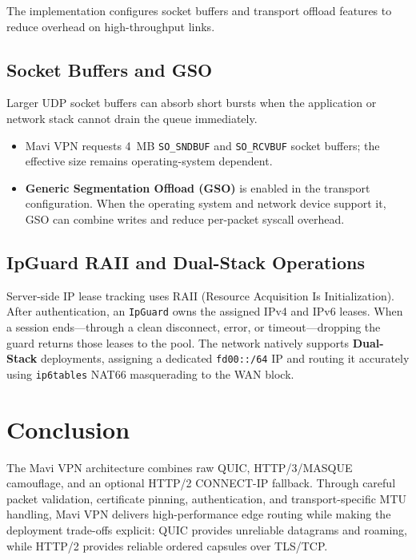 \documentclass[11pt,a4paper]{article}
\begin{document}
The implementation configures socket buffers and transport offload features to reduce overhead on high-throughput links.

\subsection{Socket Buffers and GSO}
Larger UDP socket buffers can absorb short bursts when the application or network stack cannot drain the queue immediately.
\begin{itemize}
    \item Mavi VPN requests 4~MB \texttt{SO\_SNDBUF} and \texttt{SO\_RCVBUF} socket buffers; the effective size remains operating-system dependent.
    \item \textbf{Generic Segmentation Offload (GSO)} is enabled in the transport configuration. When the operating system and network device support it, GSO can combine writes and reduce per-packet syscall overhead.
\end{itemize}

\subsection{IpGuard RAII and Dual-Stack Operations}
Server-side IP lease tracking uses RAII (Resource Acquisition Is Initialization). After authentication, an \texttt{IpGuard} owns the assigned IPv4 and IPv6 leases. When a session ends---through a clean disconnect, error, or timeout---dropping the guard returns those leases to the pool.
The network natively supports \textbf{Dual-Stack} deployments, assigning a dedicated \texttt{fd00::/64} IP and routing it accurately using \texttt{ip6tables} NAT66 masquerading to the WAN block.

\section{Conclusion}

The Mavi VPN architecture combines raw QUIC, HTTP/3/MASQUE camouflage, and an optional HTTP/2 CONNECT-IP fallback. Through careful packet validation, certificate pinning, authentication, and transport-specific MTU handling, Mavi VPN delivers high-performance edge routing while making the deployment trade-offs explicit: QUIC provides unreliable datagrams and roaming, while HTTP/2 provides reliable ordered capsules over TLS/TCP.
\end{document}
